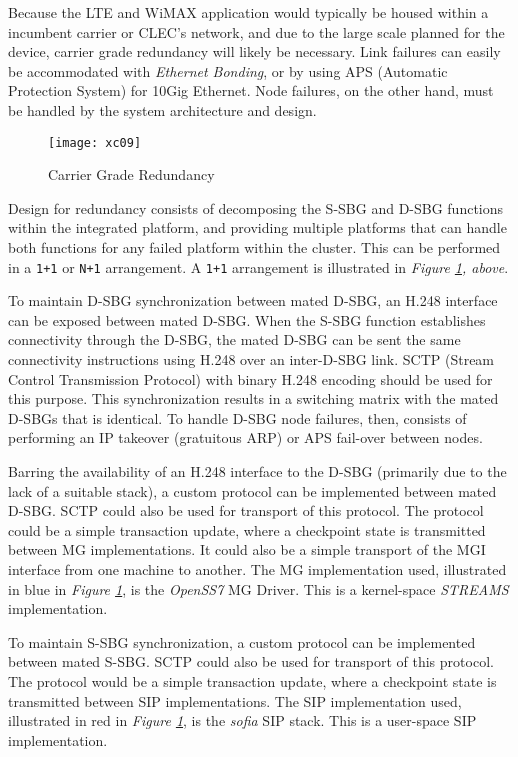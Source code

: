 \documentclass[letterpaper,final,notitlepage,twocolumn,10pt,twoside]{article}
\begin{document}
Because the LTE and WiMAX application would typically be housed within a
incumbent carrier or CLEC's network, and due to the large scale planned for the
device, carrier grade redundancy will likely be necessary.  Link failures can
easily be accommodated with {\it Ethernet Bonding}, or by using APS (Automatic
Protection System) for 10Gig Ethernet.  Node failures, on the other hand, must
be handled by the system architecture and design.

\begin{figure}[htp]
\center\texttt{[image: xc09]}
\caption{Carrier Grade Redundancy}
\label{figure:xc09}
\end{figure}

Design for redundancy consists of decomposing the S-SBG and D-SBG functions
within the integrated platform, and providing multiple platforms that can handle
both functions for any failed platform within the cluster.  This can be
performed in a {\tt 1+1} or {\tt N+1} arrangement.  A {\tt 1+1} arrangement is
illustrated in {\sl Figure \ref{figure:xc09}, above}.

To maintain D-SBG synchronization between mated D-SBG, an H.248 interface can be
exposed between mated D-SBG.  When the S-SBG function establishes connectivity
through the D-SBG, the mated D-SBG can be sent the same connectivity
instructions using H.248 over an inter-D-SBG link.  SCTP (Stream Control
Transmission Protocol) with binary H.248 encoding should be used for this
purpose.  This synchronization results in a switching matrix with the mated
D-SBGs that is identical.  To handle D-SBG node failures, then, consists of
performing an IP takeover (gratuitous ARP) or APS fail-over between nodes.

Barring the availability of an H.248 interface to the D-SBG (primarily due to
the lack of a suitable stack), a custom protocol can be implemented between
mated D-SBG.  SCTP could also be used for transport of this protocol.  The
protocol could be a simple transaction update, where a checkpoint state is
transmitted between MG implementations.  It could also be a simple transport
of the MGI interface from one machine to another.  The MG implementation used,
illustrated in blue in {\sl Figure \ref{figure:xc09}}, is the {\sl OpenSS7} MG
Driver.  This is a kernel-space {\sl STREAMS} implementation.

To maintain S-SBG synchronization, a custom protocol can be implemented between
mated S-SBG.  SCTP could also be used for transport of this protocol.  The
protocol would be a simple transaction update, where a checkpoint state is
transmitted between SIP implementations.  The SIP implementation used,
illustrated in red in {\sl Figure \ref{figure:xc09}}, is the {\sl sofia} SIP
stack.  This is a user-space SIP implementation.
\end{document}
